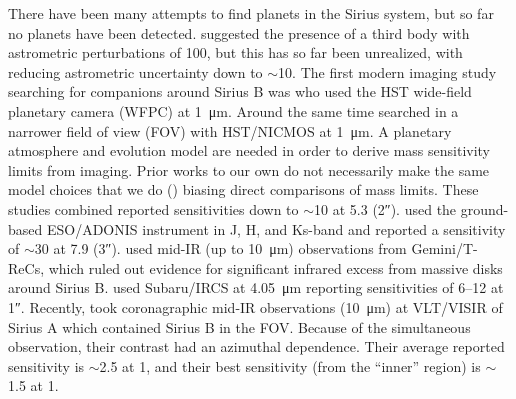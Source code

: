\documentclass[twocolumn]{aastex631}
\begin{document}
There have been many attempts to find planets in the Sirius system, but so far no planets have been detected. \citet{benestSiriusTripleStar1995} suggested the presence of a third body with astrometric perturbations of \qty{100}{\milliarcsecond}, but this has so far been unrealized, with \citet{bondSiriusSystemIts2017} reducing astrometric uncertainty down to $\sim$\qty{10}{\milliarcsecond}. The first modern imaging study searching for companions around Sirius B was \citet{schroederSearchFaintCompanions2000} who used the HST wide-field planetary camera (WFPC) at \qty{1}{\micro\meter}. Around the same time \citet{kuchnerSearchExozodiacalDust2000} searched in a narrower field of view (FOV) with HST/NICMOS at \qty{1}{\micro\meter}. A planetary atmosphere and evolution model are needed in order to derive mass sensitivity limits from imaging. Prior works to our own do not necessarily make the same model choices that we do () biasing direct comparisons of mass limits. These studies combined reported sensitivities down to $\sim$\qty{10}{\jupitermass} at \qty{5.3}{\au} (\ang{;;2}).  \citet{bonnet-bidaudADONISHighContrast2008a} used the ground-based ESO/ADONIS instrument in J, H, and Ks-band and reported a sensitivity of $\sim$\qty{30}{\jupitermass} at \qty{7.9}{\au} (\ang{;;3}). \citet{skemerSiriusImagedMidinfrared2011} used mid-IR (up to \qty{10}{\micro\meter}) observations from Gemini/T-ReCs, which ruled out evidence for significant infrared excess from massive disks around Sirius B. \citet{thalmannPiercingGlareDirect2011} used Subaru/IRCS at \qty{4.05}{\micro\meter} reporting sensitivities of \qtyrange{6}{12}{\jupitermass} at \ang{;;1}. Recently, \citet{pathakHighContrastImaging2021} took coronagraphic mid-IR observations (\qty{10}{\micro\meter}) at VLT/VISIR of Sirius A which contained Sirius B in the FOV. Because of the simultaneous observation, their contrast had an azimuthal dependence. Their average reported sensitivity is $\sim$\qty{2.5}{\jupitermass} at \qty{1}{\au}, and their best sensitivity (from the ``inner'' region) is $\sim$\qty{1.5}{\jupitermass} at \qty{1}{\au}.
\end{document}
